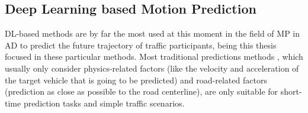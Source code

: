 \begin{comment}
\subsubsection{Deep Inverse Reinforcement Learning (DIRL)}
\label{subsubsec:2_dirl_mp}

Since the prediction problem in \ac{AD} is usually non-linear, i.e. the agent does not traverse in a straight path, it is necessary to use non-linear mapping for generalizable function approximations. In that sense, Deep Inverse Reinforcement Learning (DIRL) is proposed \cite{wulfmeier2015maximum} to approximate complex and nonlinear reward functions, which can be expressed as:

\begin{equation}
\begin{aligned}
r(\Phi(s))=f(\theta, \Phi(s))
\end{aligned}
\end{equation}

where $f$ is a nonlinear function. Some DIRL methods take historical trajectories as input. \cite{you2019advanced} consider the driving style and the road geometry, where the authors first use RL to design MDP, then learn the optimal driving policy from IRL, and use the deep neural network (DNN) to approximate the reward function. In \cite{fernando2020deep}, trajectories of traffic participants are encoded by LSTM and the reward network is learned by FCN. Currently, more DIRL-based methods directly use raw perception data. \cite{wulfmeier2017large} apply FCN for mapping the lidar data to traversability maps. The network is pre-trained to regress to a manual prior cost map and the initialize weights will be fine-tuned by the maximum entropy DIRL network. \cite{zhu2020off} use RL ConvNet and state visiting frequency (SVF) ConvNet to encode the vehicle’s kinematics and obtain the weight of the reward function by back-propagating the loss gradient \cite{wulfmeier2016watch} between expert SVF from expert demonstration and policy SVF from lidar data.
\end{comment}

\subsection{Deep Learning based Motion Prediction}
\label{sec:2_dl_based_mp}

\ac{DL}-based methods are by far the most used at this moment in the field of \ac{MP} in \ac{AD} to predict the future trajectory of traffic participants, being this thesis focused in these particular methods. Most traditional predictions methods \cite{huang2022survey}, which usually only consider physics-related factors (like the velocity and acceleration of the target vehicle that is going to be predicted) and road-related factors (prediction as close as possible to the road centerline), are only suitable for short-time prediction tasks \cite{huang2022survey} and simple traffic scenarios.

